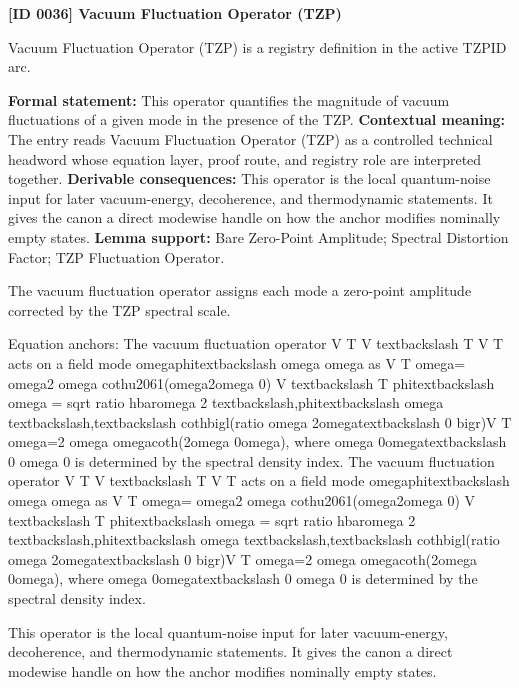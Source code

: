 \clearpage
\noindent\textbf{[ID 0036] Vacuum Fluctuation Operator (TZP)}\par
\vspace{0.35em}
\begingroup\small
{}
Vacuum Fluctuation Operator (TZP) is a registry definition in the active TZPID arc.

\begingroup\footnotesize\setlength{\emergencystretch}{3em}\sloppy
\textbf{Formal statement:} This operator quantifies the magnitude of vacuum fluctuations of a given mode in the presence of the TZP. \textbf{Contextual meaning:} The entry reads Vacuum Fluctuation Operator (TZP) as a controlled technical headword whose equation layer, proof route, and registry role are interpreted together. \textbf{Derivable consequences:} This operator is the local quantum-noise input for later vacuum-energy, decoherence, and thermodynamic statements. It gives the canon a direct modewise handle on how the anchor modifies nominally empty states. \textbf{Lemma support:} Bare Zero-Point Amplitude; Spectral Distortion Factor; TZP Fluctuation Operator.\par
\endgroup

The vacuum fluctuation operator assigns each mode a zero-point amplitude corrected by the TZP spectral scale.

Equation anchors: The vacuum fluctuation operator V T V textbackslash T V T acts on a field mode   omegaphitextbackslash omega   omega as V T  omega= omega2   omega cothu2061(omega2omega 0) V textbackslash T phitextbackslash omega = sqrt ratio hbaromega 2 textbackslash,phitextbackslash omega textbackslash,textbackslash cothbigl(ratio omega 2omegatextbackslash 0 bigr)V T  omega=2 omega  omegacoth(2omega 0omega), where omega 0omegatextbackslash 0 omega 0 is determined by the spectral density index. The vacuum fluctuation operator V T V textbackslash T V T acts on a field mode   omegaphitextbackslash omega   omega as V T  omega= omega2   omega cothu2061(omega2omega 0) V textbackslash T phitextbackslash omega = sqrt ratio hbaromega 2 textbackslash,phitextbackslash omega textbackslash,textbackslash cothbigl(ratio omega 2omegatextbackslash 0 bigr)V T  omega=2 omega  omegacoth(2omega 0omega), where omega 0omegatextbackslash 0 omega 0 is determined by the spectral density index.

This operator is the local quantum-noise input for later vacuum-energy, decoherence, and thermodynamic statements. It gives the canon a direct modewise handle on how the anchor modifies nominally empty states.
\endgroup

